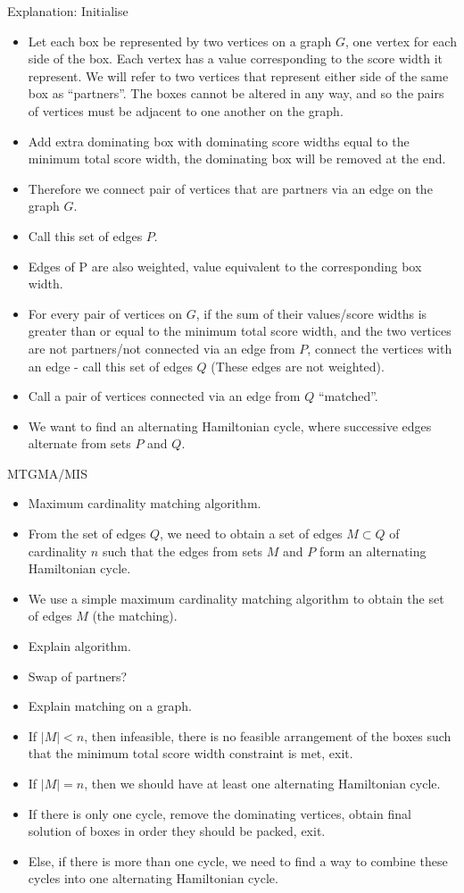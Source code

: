 \documentclass[oribibl]{llncs}
\begin{document}
Explanation: Initialise
\begin{itemize}
	\item Let each box be represented by two vertices on a graph $G$, one vertex for each side of the box. Each vertex has a value corresponding to the score width it represent. We will refer to two vertices that represent either side of the same box as ``partners''. The boxes cannot be altered in any way, and so the pairs of vertices must be adjacent to one another on the graph. 
	\item Add extra dominating box with dominating score widths equal to the minimum total score width, the dominating box will be removed at the end.
	\item Therefore we connect pair of vertices that are partners via an edge on the graph $G$.
	\item Call this set of edges $P$.
	\item Edges of P are also weighted, value equivalent to the corresponding box width.
	\item For every pair of vertices on $G$, if the sum of their values/score widths is greater than or equal to the minimum total score width, and the two vertices are not partners/not connected via an edge from $P$, connect the vertices with an edge - call this set of edges $Q$ (These edges are not weighted).
	\item Call a pair of vertices connected via an edge from $Q$ ``matched''.
	\item We want to find an alternating Hamiltonian cycle, where successive edges alternate from sets $P$ and $Q$.
\end{itemize}

MTGMA/MIS
\begin{itemize}
	\item \cite{mahadev1994} Maximum cardinality matching algorithm.
	\item From the set of edges $Q$, we need to obtain a set of edges $M \subset Q$ of cardinality $n$ such that the edges from sets $M$ and $P$ form an alternating Hamiltonian cycle.
	\item We use a simple maximum cardinality matching algorithm to obtain the set of edges $M$ (the matching).
	\item Explain algorithm.
	\item Swap of partners?
	\item Explain matching on a graph.
	\item If $|M| < n$, then infeasible, there is no feasible arrangement of the boxes such that the minimum total score width constraint is met, exit.
	\item If $|M| = n$, then we should have at least one alternating Hamiltonian cycle.
	\item If there is only one cycle, remove the dominating vertices, obtain final solution of boxes in order they should be packed, exit.
	\item Else, if there is more than one cycle, we need to find a way to combine these cycles into one alternating Hamiltonian cycle.
\end{itemize}
\end{document}
